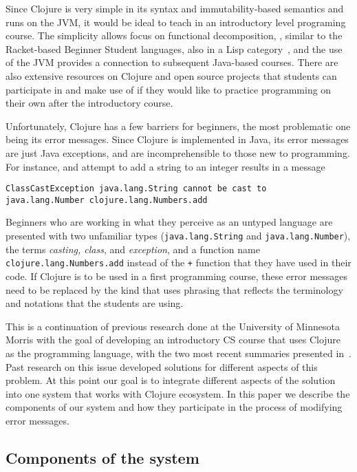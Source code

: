 \documentclass[12pt]{article}
\begin{document}
Since Clojure is very simple in its syntax and immutability-based semantics and runs on the JVM, it would be ideal to teach in an introductory level programing course.
The simplicity allows focus on functional decomposition, , similar to 
the Racket-based Beginner Student languages, also in a Lisp category~\cite{htdp}, and the use of the JVM provides a connection to subsequent Java-based courses. 
There are also extensive resources on Clojure and open source projects that students can participate in and make use of if they would like 
to practice programming on their own after the introductory course. 

Unfortunately, Clojure has a few barriers for beginners, the most problematic one being its error messages. Since Clojure is implemented in Java, 
its error messages are just Java exceptions, and are incomprehensible to those new to programming. For instance, and attempt to add a string to an integer 
results in a message 

\noindent
\begin{verbatim}
ClassCastException java.lang.String cannot be cast to 
java.lang.Number clojure.lang.Numbers.add
\end{verbatim}

\noindent 
Beginners who are working in what they perceive as an untyped language are presented with two unfamiliar types 
({\tt java.lang.String} and {\tt java.lang.Number}), the terms {\it casting, class}, and {\it exception}, and a function
name {\tt clojure.lang.Numbers.add} instead of the {\tt +} function that they have used in their code. 
If Clojure is to be used in a first programming course, these error messages need to be replaced by the kind that
uses phrasing that reflects the terminology and notations that the students are using. 

This is a continuation of previous research done at the University of Minnesota Morris with the goal of developing an introductory CS course that uses Clojure 
as the programming language, with the two most recent summaries presented in~\cite{mics2017,mics2018}. 
Past research on this issue developed solutions for different aspects of this problem.
At this point our goal is to integrate different aspects of the solution into one system that works with Clojure ecosystem. 
In this paper we describe the components of our system and how they participate in the process of modifying error messages. 

\subsection{Components of the system}
\end{document}

